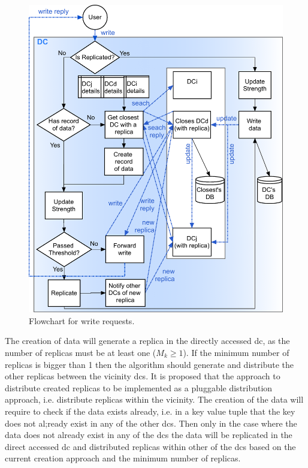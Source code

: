 \documentclass[english]{article}
\begin{document}
\begin{figure}[ht!]
	\includegraphics[width=1\textwidth]{figures/writeRequestFlowchart.png}
	
	\caption{Flowchart for write requests.}
	\label{fig:write_flowchart}
\end{figure}

The creation of data will generate a replica in the directly accessed \gls{dc}, as the number of replicas must be at least one ($M_{k} \ge 1$). If the minimum number of replicas is bigger than 1 then the algorithm should generate and distribute the other replicas between the vicinity \glspl{dc}. It is proposed that the approach to distribute created replicas to be implemented as a pluggable distribution approach, i.e. distribute replicas within the vicinity. The creation of the data will require to check if the data exists already, i.e. in a key value tuple that the key does not al;ready exist in any of the other \glspl{dc}. Then only in the case where the data does not already exist in any of the \glspl{dc} the data will be replicated in the direct accessed \gls{dc} and distributed replicas within other of the \glspl{dc} based on the current creation approach and the minimum number of replicas.
\end{document}
